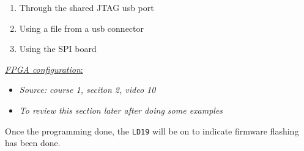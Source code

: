\begin{enumerate}

\item Through the shared JTAG usb port

\item Using a file from a usb connector

\item Using the SPI board

\end{enumerate}

\underline{\textit{FPGA configuration}:} 

\begin{itemize}

\item \textit{Source: course 1, seciton 2, video 10}

\item \textit{To review this section later after doing some examples}

\end{itemize}

Once the programming done, the \verb|LD19| will be on to indicate firmware flashing has been done.
 


